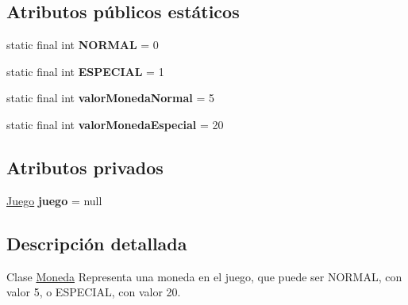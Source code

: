 \subsection*{Atributos públicos estáticos}
\begin{DoxyCompactItemize}
\item 
\hypertarget{classBatallaEspacial_1_1Moneda_a654208ec5d3777dce09f0ea94d754abf}{
static final int {\bfseries NORMAL} = 0}
\label{classBatallaEspacial_1_1Moneda_a654208ec5d3777dce09f0ea94d754abf}

\item 
\hypertarget{classBatallaEspacial_1_1Moneda_a5bfdbf4353f4232066f2784b2836aff8}{
static final int {\bfseries ESPECIAL} = 1}
\label{classBatallaEspacial_1_1Moneda_a5bfdbf4353f4232066f2784b2836aff8}

\item 
\hypertarget{classBatallaEspacial_1_1Moneda_aafc076cdffc6b1f670b68999f2da457a}{
static final int {\bfseries valorMonedaNormal} = 5}
\label{classBatallaEspacial_1_1Moneda_aafc076cdffc6b1f670b68999f2da457a}

\item 
\hypertarget{classBatallaEspacial_1_1Moneda_aed21f0c283b5dca8fe76e1a62d9883b2}{
static final int {\bfseries valorMonedaEspecial} = 20}
\label{classBatallaEspacial_1_1Moneda_aed21f0c283b5dca8fe76e1a62d9883b2}

\end{DoxyCompactItemize}
\subsection*{Atributos privados}
\begin{DoxyCompactItemize}
\item 
\hypertarget{classBatallaEspacial_1_1Moneda_ac6efe7b8d5bc79b472de1a920e27c414}{
\hyperlink{classBatallaEspacial_1_1Juego}{Juego} {\bfseries juego} = null}
\label{classBatallaEspacial_1_1Moneda_ac6efe7b8d5bc79b472de1a920e27c414}

\end{DoxyCompactItemize}


\subsection{Descripción detallada}
Clase \hyperlink{classBatallaEspacial_1_1Moneda}{Moneda} Representa una moneda en el juego, que puede ser NORMAL, con valor 5, o ESPECIAL, con valor 20. 

